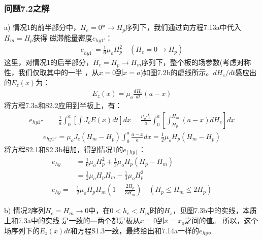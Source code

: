 \subsubsection{问题7.2之解}
a) 情况1的前半部分中，$H_e=0*\rightarrow H_p$序列下，我们通过向方程7.13a中代入$H_m=H_p$获得
磁滞能量密度$e_{hy1'}$：
\begin{align*}%
e_{hy1^\prime}=\frac{1}{6}\mu_oH_{p}^{2}  \quad     (H_e=0\rightarrow H_p) \tag{S2.1}
\end{align*}
这里，对情况1的后半部分，$H_e=H_p\rightarrow H_m$序列下，整个板的场参数(考虑对称性，我们仅取其中的一半
，从$x=0$到$x=a$)如图7.2b的虚线所示。$dH_e/dt$感应出的$E_z(x)$为：
\begin{align*}%
E_z(x)=\mu_o\frac{dH_e}{dt}(a-x) \tag{S2.2}
\end{align*}
将方程7.3a和S2.2应用到半板上，有：
\begin{align*}%
e_{hy1''}&=\frac{1}{a}\int_{0}^{a}\left[\int J_cE(x)dt\right]dx=\frac{\mu_oJ_c}{a}\int_{0}^{a}\left[\int_{H_p}^{H_m}(a-x)dH_e\right]dx \tag{S2.3a}
\end{align*}
\begin{align*}
e_{hy1''}=\mu_oJ_c(H_m-H_p)\int_{0}^{a}\frac{a-x}{a}dx=\frac{1}{2}\mu_oH_p(H_m-H_p)\tag{S2.3b}
\end{align*}
将方程S2.1和S2.3b相加，得到情况1的$e_[hy]$：
\begin{align*}%
e_{hy}&=\frac{1}{6}\mu_oH_{p}^{2}+\frac{1}{2}\mu_oH_p(H_p-H_m) \\
&=\frac{1}{2}\mu_oH_pH_m-\frac{1}{3}\mu_oH_{p}^{2}\\
e_{hy}=&\frac{1}{2}\mu_oH_pH_m\left(1-\frac{2H_p}{3H_m}\right) \quad (H_p\leq H_m\leq 2H_p) \tag{7.13b}
\end{align*}

b) 情况2序列$H_e=H_m\rightarrow 0$中，在$0<h_e<H_m$时的$H_s$，见图7.3b中的实线，本质上和7.3a中的实线
是一致的---两个都是板从$x=0$到$x=x_0$之间的值。
所以，这个场序列下的$E_z(x)dt$和方程S1.3一致，最终给出和7.14a一样的$e_{hy}$。


